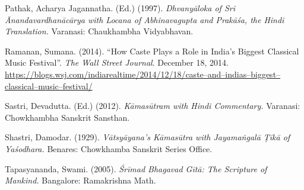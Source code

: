 \begin{thebibliography}{99}
  Pathak, Acharya Jagannatha. (Ed.) (1997). \textit{Dhvanyāloka of Sri Ānandavardhanācārya with Locana of Abhinavagupta and Prakāśa, the Hindi Translation.} Varanasi: Chaukhambha Vidyabhavan.

  Ramanan, Sumana. (2014). “How Caste Plays a Role in India’s Biggest Classical Music Festival”. \textit{The Wall Street Journal}. December 18, 2014. \url{https://blogs.wsj.com/indiarealtime/2014/12/18/caste–and–indias–biggest–classical–music–festival/}

  Sastri, Devadutta. (Ed.) (2012). \textit{Kāmasūtram with Hindi Commentary.} Varanasi: Chowkhambha Sanskrit Sansthan.

  Shastri, Damodar. (1929). \textit{Vātsyāyana’s Kāmasūtra with Jayamaṅgalā Ṭīkā of Yaśodhara.} Benares: Chowkhamba Sanskrit Series Office.

  Tapasyananda, Swami. (2005). \textit{Śrīmad Bhagavad Gītā: The Scripture of Mankind.} Bangalore: Ramakrishna Math.

 \end{thebibliography}

